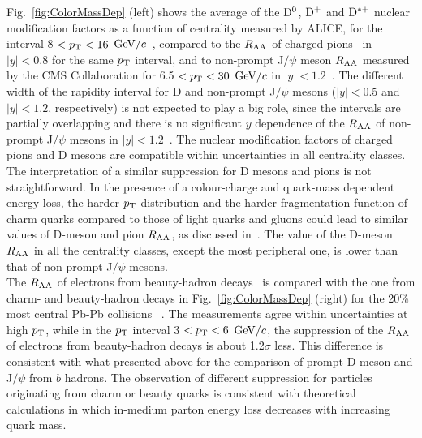 Fig.~\ref{fig:ColorMassDep} (left) shows the average of the ${\rm D^0}$, ${\rm D^+}$ and ${\rm D^{*+}}$ 
nuclear modification factors as a function of centrality measured by ALICE, 
for the interval 8 $< p_{\rm T} < 16$ $\mathrm{GeV}/c$~\cite{Adam:2015nna}, 
compared to the $R_{\rm AA}$ of charged pions~\cite{Abelev:2014laa} in $|y| < 0.8$ for the same $p_{\rm T}$ interval, 
and to non-prompt J$/\psi$ meson $R_{\rm AA}$ measured by the CMS Collaboration for 6.5 $< p_{\rm T} < 30$ $\mathrm{GeV}/c$ 
in $|y| < 1.2$~\cite{Khachatryan:2016ypw}. The different width of the rapidity interval for D and non-prompt
J$/\psi$ mesons ($|y| < 0.5$ and $|y| < 1.2$, respectively) is not expected to play a big role, since
the intervals are partially overlapping and there is no significant $y$ dependence of the $R_{\rm AA}$ of 
non-prompt J$/\psi$ mesons in $|y| < 1.2$~\cite{Khachatryan:2016ypw}. The nuclear modification 
factors of charged pions and D mesons are compatible within uncertainties
in all centrality classes. The interpretation of a similar suppression for D mesons and pions is not
straightforward. In the presence of a colour-charge and quark-mass dependent 
energy loss, the harder $p_{\rm T}$ distribution and the harder fragmentation function of 
charm quarks compared to those of light quarks and gluons could lead to similar 
values of D-meson and pion $R_{\rm AA}$, as discussed in~\cite{Djordjevic:2013pba}. 
The value of the D-meson $R_{\rm AA}$ in all the centrality
classes, except the most peripheral one, is lower than that of non-prompt J$/\psi$ mesons. \\
The $R_{\rm AA}$ of electrons from beauty-hadron decays~\cite{Adam:2016wyz} is compared with the one from charm- and
beauty-hadron decays in Fig.~\ref{fig:ColorMassDep} (right) for the 20\% most central Pb-Pb collisions
~\cite{Adam:2016khe}. The measurements agree within uncertainties at high $p_{\rm T}$, while in the $p_{\rm T}$ 
interval 3 $< p_{\rm T} < 6$ $\mathrm{GeV}/c$, the suppression of the $R_{\rm AA}$ of electrons from beauty-hadron decays 
is about 1.2$\sigma$ less. This difference is consistent with what 
presented above for the comparison of prompt D meson 
and J$/\psi$ from $b$ hadrons. The observation of different suppression for particles originating from
charm or beauty quarks is consistent with theoretical calculations in which in-medium parton energy loss 
decreases with increasing quark mass.
